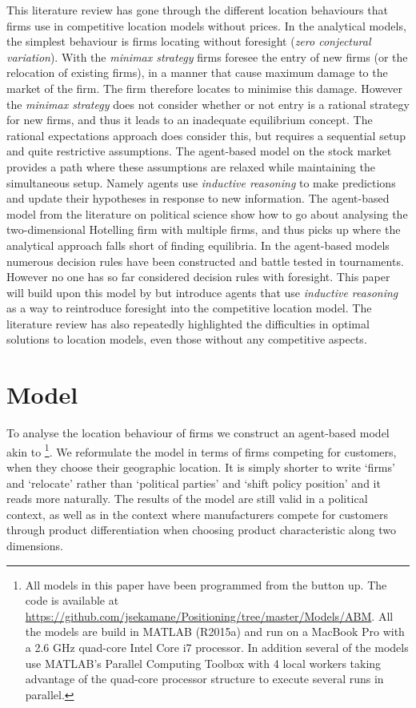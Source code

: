 \documentclass[preprint, 12pt]{elsarticle}
\begin{document}
This literature review has gone through the different location behaviours that firms use in competitive location models without prices. In the analytical models, the simplest behaviour is firms locating without foresight (\emph{zero conjectural variation}). With the \emph{minimax strategy} firms foresee the entry of new firms (or the relocation of existing firms), in a manner that cause maximum damage to the market of the firm. The firm therefore locates to minimise this damage. However the \emph{minimax strategy} does not consider whether or not entry is a rational strategy for new firms, and thus it leads to an inadequate equilibrium concept. The rational expectations approach does consider this, but requires a sequential setup and quite restrictive assumptions. The agent-based model on the stock market provides a path where these assumptions are relaxed while maintaining the simultaneous setup. Namely agents use \emph{inductive reasoning} to make predictions and update their hypotheses in response to new information. The agent-based model from the literature on political science show how to go about analysing the two-dimensional Hotelling firm with multiple firms, and thus picks up where the analytical approach falls short of finding equilibria. In the agent-based models numerous decision rules have been constructed and battle tested in tournaments. However no one has so far considered decision rules with foresight. This paper will build upon this model by \citet{Laver_Sergenti_2011} but introduce agents that use \emph{inductive reasoning} as a way to reintroduce foresight into the competitive location model. The literature review has also repeatedly highlighted the difficulties in optimal solutions to location models, even those without any competitive aspects.


\section{Model}

To analyse the location behaviour of firms we construct an agent-based model akin to \citet{Laver_Sergenti_2011}\footnote{All models in this paper have been programmed from the button up. The code is available at \url{https://github.com/jsekamane/Positioning/tree/master/Models/ABM}. All the models are build in MATLAB (R2015a) and run on a MacBook Pro with a 2.6 GHz quad-core Intel Core i7 processor. In addition several of the models use MATLAB's Parallel Computing Toolbox with 4 local workers taking advantage of the quad-core processor structure to execute several runs in parallel.}. We reformulate the model in terms of firms competing for customers, when they choose their geographic location. It is simply shorter to write `firms' and `relocate' rather than `political parties' and `shift policy position' and it reads more naturally. The results of the model are still valid in a political context, as well as in the context where manufacturers compete for customers through product differentiation when choosing product characteristic along two dimensions. 
\end{document}
